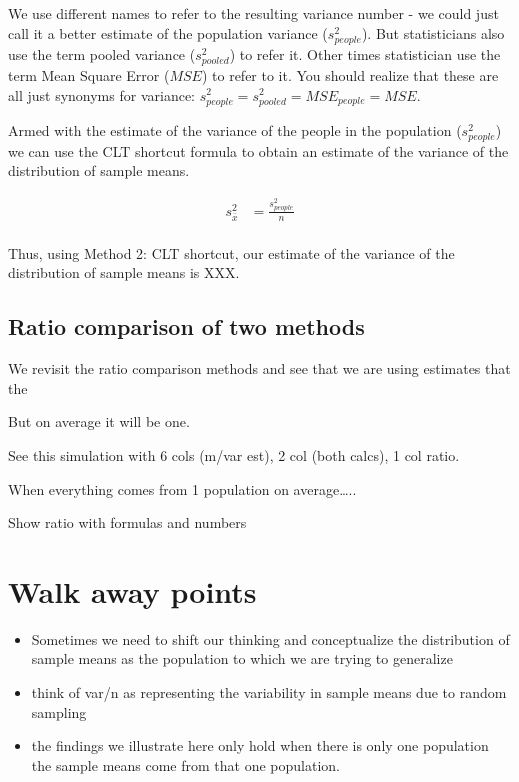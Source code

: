 \documentclass[
]{krantz}
\providecommand{\tightlist}{%
  \setlength{\itemsep}{0pt}\setlength{\parskip}{0pt}}
\begin{document}
We use different names to refer to the resulting variance number - we could just call it a better estimate of the population variance (\(s_{people}^2\)). But statisticians also use the term pooled variance (\(s_{pooled}^2\)) to refer it. Other times statistician use the term Mean Square Error (\(MSE\)) to refer to it. You should realize that these are all just synonyms for variance: \(s_{people}^2 = s_{pooled}^2 = MSE_{people} = MSE\).

Armed with the estimate of the variance of the people in the population (\(s_{people}^2\)) we can use the CLT shortcut formula to obtain an estimate of the variance of the distribution of sample means.

\[
\begin{aligned} 
s_{\bar{x}}^2 &= \frac{s_{people}^2}{n}\\
\end{aligned} 
\]

Thus, using Method 2: CLT shortcut, our estimate of the variance of the distribution of sample means is XXX.

\hypertarget{ratio-comparison-of-two-methods-1}{%
\subsection{Ratio comparison of two methods}\label{ratio-comparison-of-two-methods-1}}

We revisit the ratio comparison methods and see that we are using estimates that the

But on average it will be one.

See this simulation with 6 cols (m/var est), 2 col (both calcs), 1 col ratio.

When everything comes from 1 population on average\ldots..

Show ratio with formulas and numbers

\hypertarget{walk-away-points}{%
\section{Walk away points}\label{walk-away-points}}

\begin{itemize}
\tightlist
\item
  Sometimes we need to shift our thinking and conceptualize the distribution of sample means as the population to which we are trying to generalize
\item
  think of var/n as representing the variability in sample means due to random sampling
\item
  the findings we illustrate here only hold when there is only one population the sample means come from that one population.
\end{itemize}
\end{document}
